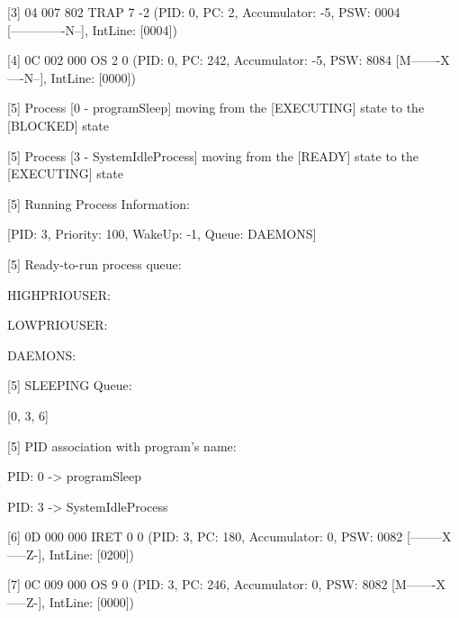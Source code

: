 [3] {04 007 802} TRAP 7 -2 (PID: \textcolor{termgreen}{0}, PC: \textcolor{termred}{2}, Accumulator: \textcolor{termred}{-5}, PSW: \textcolor{termred}{0004} [\textcolor{termred}{-------------N--}], IntLine: [\textcolor{termred}{0004}])

[\textcolor{termred}{4}] {0C 002 000} OS 2 0 (PID: \textcolor{termgreen}{0}, PC: \textcolor{termred}{242}, Accumulator: \textcolor{termred}{-5}, PSW: \textcolor{termred}{8084} [\textcolor{termred}{M-------X----N--}], IntLine: [\textcolor{termred}{0000}])

	[\textcolor{termred}{5}] Process [\textcolor{termgreen}{0} - \textcolor{termgreen}{programSleep}] moving from the [\textcolor{termgreen}{EXECUTING}] state to the [\textcolor{termgreen}{BLOCKED}] state

	[\textcolor{termred}{5}] Process [\textcolor{termgreen}{3} - \textcolor{termgreen}{SystemIdleProcess}] moving from the [\textcolor{termgreen}{READY}] state to the [\textcolor{termgreen}{EXECUTING}] state

	[\textcolor{termred}{5}] Running Process Information:

		[PID: \textcolor{termgreen}{3}, Priority: 100, WakeUp: \textcolor{termred}{-1}, Queue: DAEMONS]

	[\textcolor{termred}{5}] Ready-to-run process queue:

 		HIGHPRIOUSER: 

		LOWPRIOUSER: 

		DAEMONS: 

	[\textcolor{termred}{5}] SLEEPING Queue:

		[\textcolor{termgreen}{0}, 3, \textcolor{termred}{6}]

	[\textcolor{termred}{5}] PID association with program's name:

		PID: \textcolor{termgreen}{0} -> programSleep

		PID: \textcolor{termgreen}{3} -> SystemIdleProcess

[\textcolor{termred}{6}] {0D 000 000} IRET 0 0 (PID: \textcolor{termgreen}{3}, PC: \textcolor{termred}{180}, Accumulator: \textcolor{termred}{0}, PSW: \textcolor{termred}{0082} [\textcolor{termred}{--------X-----Z-}], IntLine: [\textcolor{termred}{0200}])

[\textcolor{termred}{7}] {0C 009 000} OS 9 0 (PID: \textcolor{termgreen}{3}, PC: \textcolor{termred}{246}, Accumulator: \textcolor{termred}{0}, PSW: \textcolor{termred}{8082} [\textcolor{termred}{M-------X-----Z-}], IntLine: [\textcolor{termred}{0000}])

